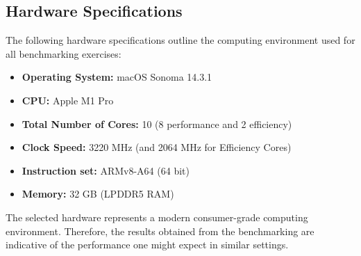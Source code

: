 \documentclass[]{final_report}
\theoremstyle{definition}
\begin{document}

\subsection{Hardware Specifications}
The following hardware specifications outline the computing environment used for all benchmarking exercises:
\begin{itemize}

\item \textbf{Operating System:} macOS Sonoma 14.3.1
\item \textbf{CPU:} Apple M1 Pro
\item \textbf{Total Number of Cores:} 10 (8 performance and 2 efficiency)
\item \textbf{Clock Speed:} 3220 MHz (and 2064 MHz for Efficiency Cores)
\item \textbf{Instruction set:} ARMv8-A64 (64 bit)
\item \textbf{Memory:} 32 GB (LPDDR5 RAM)
\end{itemize}

The selected hardware represents a modern consumer-grade computing environment. Therefore, the results obtained from the benchmarking are indicative of the performance one might expect in similar settings.
\end{document}
